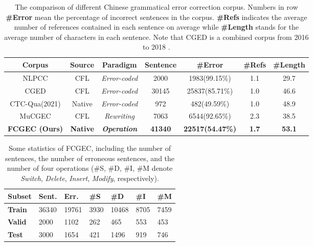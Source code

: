 \documentclass[11pt]{article}
\begin{document}
\begin{table*}[ht]
\centering
\begin{tabular}{ccccccc}
\toprule
\textbf{Corpus}                         & \textbf{Source}    & \textbf{Paradigm}          & \textbf{Sentence}     & \textbf{\#Error}   & \textbf{\#Refs} &  \textbf{\#Length}                \\ \hline
NLPCC\citeyearpar{zhao2018overview}  & CFL                & \emph{Error-coded}         &2000                      & 1983(99.15\%)      & 1.1                & 29.7                            \\
CGED                                   & CFL                & \emph{Error-coded}       &30145                      & 25837(85.71\%) & 1.0              & 46.6              \\
CTC-Qua(2021)                          & Native             & \emph{Error-coded}         &972                     & 482(49.59\%)       & 1.0                 &  48.9                  \\
MuCGEC\citeyearpar{zhang2022mucgec}      & CFL                & \emph{Rewriting}           &7063                  & 6544(92.65\%)      & 2.3                & 38.5                   \\ \hline
\textbf{FCGEC (Ours)} & \textbf{Native}    & \textbf{\emph{Operation}}  &\textbf{41340}         & \textbf{22517(54.47\%)}     & \textbf{1.7}   &\textbf{53.1}                            \\ \bottomrule
\end{tabular}
\caption{The comparison of different Chinese grammatical error correction corpus. Numbers in row \textbf{\#Error} mean the percentage of incorrect sentences in the corpus. \textbf{\#Refs} indicates the average number of references contained in each sentence on average while \textbf{\#Length} stands for the average number of characters in each sentence. Note that CGED is a combined corpus from 2016 to 2018 \cite{rao2018overview, rao2020overview}.}
\label{tab:dataset-compare}
\end{table*}
 
\begin{table}[ht]
\fontsize{10}{12}\selectfont
\begin{tabular}{p{0.9cm} p{0.65cm} p{0.65cm} p{0.65cm} p{0.65cm} p{0.65cm} p{0.65cm}}
\toprule
\textbf{Subset} & \textbf{Sent.} & \textbf{Err.} & \textbf{\#S} & \textbf{\#D} & \textbf{\#I} & \textbf{\#M}\\ \hline
\textbf{Train}  & 36340 &  19761 & 3930  & 10468 & 8705  & 7459     \\
\textbf{Valid}  & 2000  &  1102  & 262   & 465  & 553   & 453     \\
\textbf{Test}   & 3000  &  1654  & 421   & 1496  & 919   &746    \\
\bottomrule 
\end{tabular}

\caption{Some statistics of FCGEC, including the number of sentences, the number of erroneous sentences, and the number of four operations (\#S, \#D, \#I, \#M denote \emph{Switch}, \emph{Delete}, \emph{Insert}, \emph{Modify}, respectively). }

\label{tab:dataset-statistic}
\end{table} 
\end{document}
